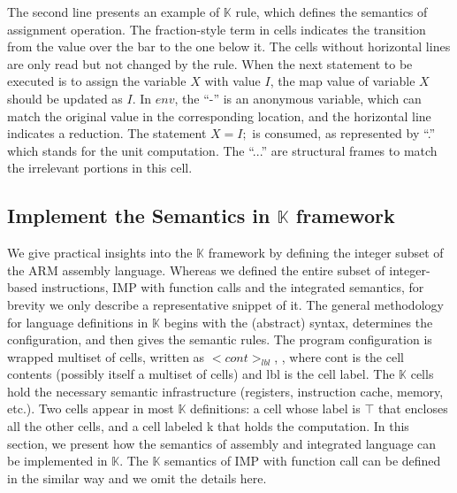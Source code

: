 \documentclass[letterpaper, 10 pt, conference]{IEEEtran}
\begin{document}
\par The second line presents an example of $\mathbb{K}$ rule, which defines the semantics of assignment operation. The fraction-style term in cells indicates the transition from the value over the bar to the one below it. The cells without horizontal lines are only read but not changed by the rule.
When the next statement to be executed is to assign the variable $X$ with value $I$, the map value of variable $X$ should be updated as $I$. In $env$,  the ``-'' is an  anonymous variable, which can match the original value in the corresponding location, and the horizontal line indicates a reduction. The statement $X=I;$ is consumed, as represented by ``.'' which stands for the unit computation. The ``...'' are structural frames to match the irrelevant portions in this cell.

\subsection{Implement the Semantics in $\mathbb{K}$ framework}
\par We give practical insights into the $\mathbb{K}$ framework by defining the integer subset of the ARM assembly language.
 Whereas we defined the entire subset of integer-based instructions, IMP with function calls and the integrated semantics, for brevity we only describe a representative snippet of it. The general methodology for language definitions in $\mathbb{K}$ begins with the (abstract) syntax, determines the configuration, and then gives the semantic rules. The program configuration is wrapped multiset of cells, written as $<cont>_{lbl}$, , where cont is
the cell contents (possibly itself a multiset of cells) and lbl is the cell label. The $\mathbb{K}$ cells hold the necessary semantic infrastructure (registers, instruction cache, memory, etc.). Two cells appear in most $\mathbb{K}$ definitions: a cell whose label is $\top$ that encloses all the other cells, and a cell labeled k that holds the computation. In this section, we present how the semantics of assembly and integrated language can be implemented in $\mathbb{K}$. The $\mathbb{K}$ semantics of IMP with function call can be defined in the similar way and we omit the details here.
\end{document}
